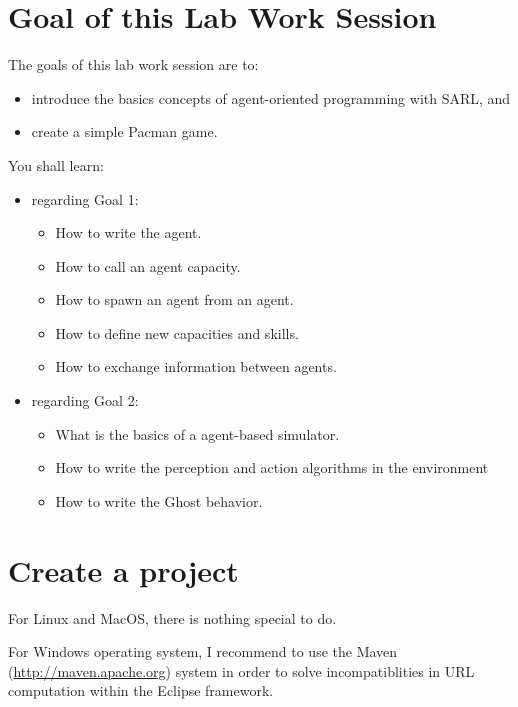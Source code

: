 \documentclass[article,english,nodocumentinfo]{utbmciadreport}
\begin{document}
\section{Goal of this Lab Work Session}

The goals of this lab work session are to:
\begin{itemize}
\item introduce the basics concepts of agent-oriented programming with SARL, and
\item create a simple Pacman game.
\end{itemize}

You shall learn: 
\begin{itemize}
\item regarding Goal 1:
	\begin{itemize}
	\item How to write the agent.
	\item How to call an agent capacity.
	\item How to spawn an agent from an agent.
	\item How to define new capacities and skills.
	\item How to exchange information between agents.
	\end{itemize}
\item regarding Goal 2:
	\begin{itemize}
	\item What is the basics of a agent-based simulator.
	\item How to write the perception and action algorithms in the environment
	\item How to write the Ghost behavior.
	\end{itemize}
\end{itemize}



\section{Create a project}

For Linux and MacOS, there is nothing special to do.

For Windows operating system, I recommend to use the Maven (\url{http://maven.apache.org}) system in order to solve incompatiblities in URL computation within the Eclipse framework.
\end{document}
